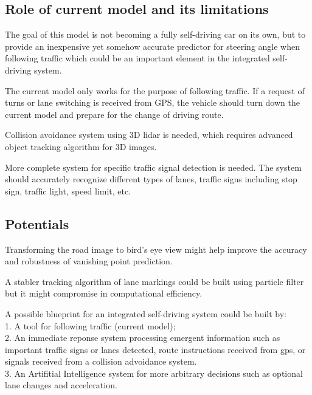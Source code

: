 \documentclass[11pt, oneside]{article}
\begin{document}
\subsection*{Role of current model and its limitations}

The goal of this model is not becoming a fully self-driving car on its own, but to provide an inexpensive yet somehow accurate predictor for steering angle when following traffic which could be an important element in the integrated self-driving system. 

The current model only works for the purpose of following traffic. If a request of turns or lane switching is received from GPS, the vehicle should turn down the current model and prepare for the change of driving route. 

Collision avoidance system using 3D lidar is needed, which requires advanced object tracking algorithm for 3D images. 

More complete system for specific traffic signal detection is needed. The system should accurately recognize different types of lanes, traffic signs including stop sign, traffic light, speed limit, etc. 

\subsection*{Potentials}

Transforming the road image to bird's eye view might help improve the accuracy and robustness of vanishing point prediction. 

A stabler tracking algorithm of lane markings could be built using particle filter but it might compromise in computational efficiency. 


A possible blueprint for an integrated self-driving system could be built by:\\
1. A tool for following traffic (current model); \\
2. An immediate reponse system processing emergent information such as important traffic signs or lanes detected, route instructions received from gps, or signals received from a collision advoidance system. \\
3. An Artifitial Intelligence system for more arbitrary decisions such as optional lane changes and acceleration. 







\end{document}
